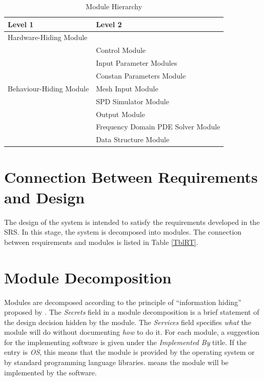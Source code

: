 \documentclass[12pt, titlepage]{article}
\begin{document}
	
	\begin{table}[h!] \centering \begin{tabular}{p{} p{}}
			\toprule \textbf{Level 1} & \textbf{Level 2}\\ \midrule
			
			{Hardware-Hiding Module} & ~ \\ \midrule
			
			\multirow{7}{0.3\textwidth}{Behaviour-Hiding Module} & \progname{} Control
			Module\\ & Input Parameter Modules\\ & Constan Parameters Module\\ & Mesh Input
			Module\\ & SPD Simulator Module\\ & Output Module\\
			
			\midrule
			
			\multirow{3}{0.3\textwidth}{Software Decision Module} & Frequency Domain PDE
			Solver Module\\ & Data Structure Module\\ \bottomrule
			
		\end{tabular} \caption{Module Hierarchy} \label{TblMH} \end{table}
	
	\section{Connection Between Requirements and Design} \label{SecConnection}
	
	The design of the system is intended to satisfy the requirements developed in
	the SRS. In this stage, the system is decomposed into modules. The connection
	between requirements and modules is listed in Table \ref{TblRT}.
	
	
	\section{Module Decomposition} \label{SecMD}
	
	Modules are decomposed according to the principle of ``information hiding''
	proposed by \citet{ParnasEtAl1984}. The \emph{Secrets} field in a module
	decomposition is a brief statement of the design decision hidden by the module.
	The \emph{Services} field specifies \emph{what} the module will do without
	documenting \emph{how} to do it. For each module, a suggestion for the
	implementing software is given under the \emph{Implemented By} title. If the
	entry is \emph{OS}, this means that the module is provided by the operating
	system or by standard programming language libraries.  \emph{\progname{}} means
	the module will be implemented by the \progname{} software.
	
\end{document}
